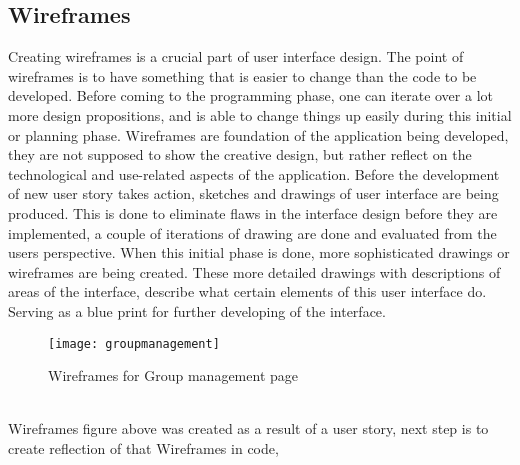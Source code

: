 \subsection{Wireframes}
Creating wireframes is a crucial part of user interface design. The point of wireframes is to have something that is easier to change than the code to be developed. Before coming to the programming phase, one can iterate over a lot more design propositions, and is able to change things up easily during this initial or planning phase. Wireframes are foundation of the application being developed, they are not supposed to show the creative design, but rather reflect on the technological and use-related aspects of the application. Before the development of new user story takes action, sketches and drawings of user interface are being produced. This is done to eliminate flaws in the interface design before they are implemented, a couple of iterations of drawing are done and evaluated from the users perspective. When this initial phase is done, more sophisticated drawings or wireframes are being created. These more detailed drawings with descriptions of areas of the interface, describe what certain elements of this user interface do. Serving as a blue print for further developing of the interface.
\begin{figure}[h]
  {\texttt{[image: groupmanagement]}}
  \caption{Wireframes for Group management page}
  \label{fig:groupmanagement}
\end{figure}
\\Wireframes figure above was created as a result of a user story, next step is to create reflection of that Wireframes in code, 

